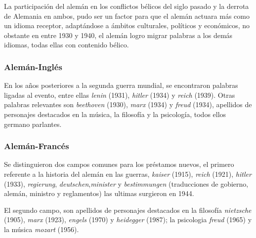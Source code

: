 
La participación del alemán en los conflictos bélicos del siglo pasado y la derrota de Alemania en ambos, pudo ser un factor para que el alemán actuara más como un idioma receptor, adaptándose a ámbitos culturales, políticos y económicos,  no obstante en  
entre 1930 y 1940,  el alemán logro migrar palabras a los demás idiomas,  todas ellas con contenido bélico. 





\subsubsection*{Alemán-Inglés}%

En los años posteriores a la segunda guerra mundial, se encontraron palabras ligadas al evento, entre ellas \textit{lenin} (1931), \textit{hitler} (1934) y \textit{reich} (1939).  Otras palabras relevantes son \textit{beethoven} (1930), \textit{marx} (1934) y \textit{freud} (1934), apellidos de personajes destacados en la música, la filosofía y la psicología, todos ellos germano parlantes.


\subsubsection*{Alemán-Francés}%


Se distinguieron dos campos comunes para los préstamos nuevos,  el primero referente a la historia del alemán en las guerras, \textit{kaiser} (1915), \textit{reich} (1921), \textit{hitler} (1933),  \textit{regierung}, \textit{deutschen},\textit{minister} y  \textit{bestimmungen} (traducciones de gobierno, alemán, ministro y reglamentos) las ultimas surgieron en 1944.  

El segundo campo, son apellidos de  personajes destacados en la filosofía \textit{nietzsche} (1905),  \textit{marx} (1923), \textit{engels} (1970) y \textit{heidegger} (1987); la psicologia \textit{freud} (1965)  y  la música \textit{mozart} (1956). 

